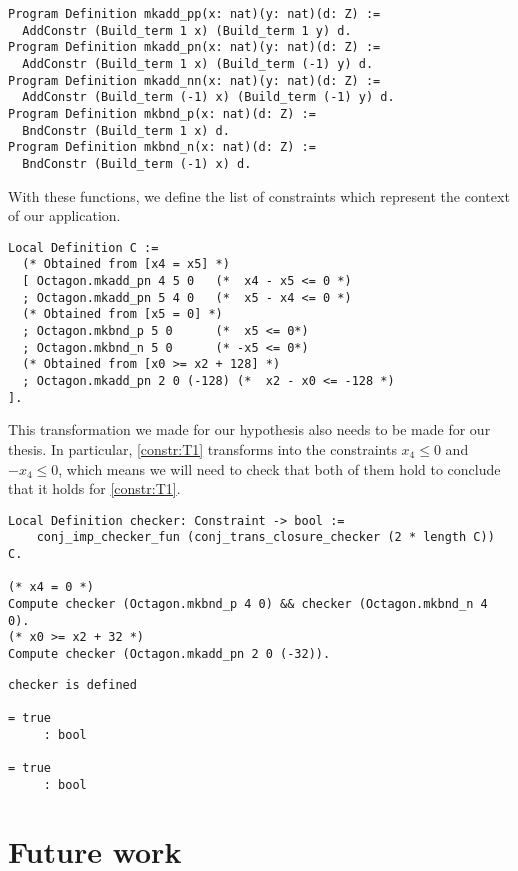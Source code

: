 \begin{verbatim}
Program Definition mkadd_pp(x: nat)(y: nat)(d: Z) :=
  AddConstr (Build_term 1 x) (Build_term 1 y) d.
Program Definition mkadd_pn(x: nat)(y: nat)(d: Z) :=
  AddConstr (Build_term 1 x) (Build_term (-1) y) d.
Program Definition mkadd_nn(x: nat)(y: nat)(d: Z) :=
  AddConstr (Build_term (-1) x) (Build_term (-1) y) d.
Program Definition mkbnd_p(x: nat)(d: Z) :=
  BndConstr (Build_term 1 x) d.
Program Definition mkbnd_n(x: nat)(d: Z) :=
  BndConstr (Build_term (-1) x) d.
\end{verbatim}

With these functions, we define the list of constraints which represent the
context of our application.

\begin{verbatim}
Local Definition C := 
  (* Obtained from [x4 = x5] *)
  [ Octagon.mkadd_pn 4 5 0   (*  x4 - x5 <= 0 *)
  ; Octagon.mkadd_pn 5 4 0   (*  x5 - x4 <= 0 *)
  (* Obtained from [x5 = 0] *)
  ; Octagon.mkbnd_p 5 0      (*  x5 <= 0*)
  ; Octagon.mkbnd_n 5 0      (* -x5 <= 0*)
  (* Obtained from [x0 >= x2 + 128] *)
  ; Octagon.mkadd_pn 2 0 (-128) (*  x2 - x0 <= -128 *)
].
\end{verbatim}

This transformation we made for our hypothesis also needs to be made for our
thesis. In particular, \ref{constr:T1} transforms into the constraints $x_4 \le 0$
and $-x_4 \le 0$, which means we will need to check that both of them hold to
conclude that it holds for \ref{constr:T1}.

\begin{verbatim}
Local Definition checker: Constraint -> bool := 
    conj_imp_checker_fun (conj_trans_closure_checker (2 * length C)) C.

(* x4 = 0 *)
Compute checker (Octagon.mkbnd_p 4 0) && checker (Octagon.mkbnd_n 4 0).
(* x0 >= x2 + 32 *)
Compute checker (Octagon.mkadd_pn 2 0 (-32)).
\end{verbatim}
\vspace{-\baselineskip*3/2}
\begin{verbatim}
checker is defined

= true
     : bool

= true
     : bool
\end{verbatim}

\section{Future work}
\label{sect:future-work}

